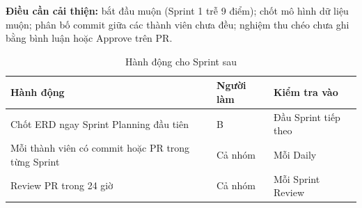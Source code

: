 \textbf{Điều cần cải thiện:} bắt đầu muộn (Sprint 1 trễ 9 điểm); chốt mô hình dữ liệu muộn; phân bố commit giữa các thành viên chưa đều; nghiệm thu chéo chưa ghi bằng bình luận hoặc Approve trên PR.
\begin{table}[htbp]\centering
\caption{Hành động cho Sprint sau}\label{tab:action}
\begin{tabular}{@{}p{6.3cm}p{3.2cm}p{3.2cm}@{}}\toprule
\textbf{Hành động} & \textbf{Người làm} & \textbf{Kiểm tra vào} \\ \midrule
Chốt ERD ngay Sprint Planning đầu tiên & B & Đầu Sprint tiếp theo \\
Mỗi thành viên có commit hoặc PR trong từng Sprint & Cả nhóm & Mỗi Daily \\
Review PR trong 24 giờ & Cả nhóm & Mỗi Sprint Review \\ \bottomrule
\end{tabular}
\end{table}
